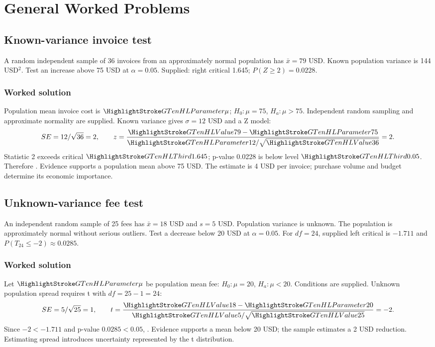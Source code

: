 \section{General Worked Problems}\label{sec:general-worked}
\subsection{Known-variance invoice test}\label{prob:known}
A random independent sample of 36 invoices from an approximately normal population has $\bar x=79$ USD. Known population variance is 144 USD$^2$. Test an increase above 75 USD at $\alpha=0.05$. Supplied: right critical 1.645; $P(Z\ge2)=0.0228$.
\subsubsection*{Worked solution}\label{sol:known}
Population mean invoice cost is $\Pop{\mu}$; $H_0:\mu=75$, $H_a:\mu>75$. Independent random sampling and approximate normality are supplied. Known variance gives $\sigma=12$ USD and a Z model:
\[
SE=12/\sqrt{36}=2,\qquad z=\frac{\Obs{79}-\Pop{75}}{\Pop{12}/\sqrt{\Obs{36}}}=2.
\]
Statistic 2 exceeds critical $\Design{1.645}$; p-value 0.0228 is below level $\Design{0.05}$. Therefore . Evidence supports a population mean above 75 USD. The estimate is 4 USD per invoice; purchase volume and budget determine its economic importance.
\subsection{Unknown-variance fee test}\label{prob:unknown}
An independent random sample of 25 fees has $\bar x=18$ USD and $s=5$ USD. Population variance is unknown. The population is approximately normal without serious outliers. Test a decrease below 20 USD at $\alpha=0.05$. For $df=24$, supplied left critical is $-1.711$ and $P(T_{24}\le-2)\approx0.0285$.
\subsubsection*{Worked solution}\label{sol:unknown}
Let $\Pop{\mu}$ be population mean fee: $H_0:\mu=20$, $H_a:\mu<20$. Conditions are supplied. Unknown population spread requires t with $df=25-1=24$:
\[
SE=5/\sqrt{25}=1,\qquad t=\frac{\Obs{18}-\Pop{20}}{\Obs{5}/\sqrt{\Obs{25}}}=-2.
\]
Since $-2<-1.711$ and p-value $0.0285<0.05$, . Evidence supports a mean below 20 USD; the sample estimates a 2 USD reduction. Estimating spread introduces uncertainty represented by the t distribution.
